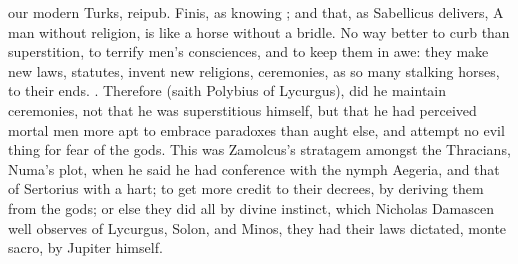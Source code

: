 {our modern Turks, reipub. Finis, as knowing ; and that, as Sabellicus delivers, A man without
religion, is like a horse without a bridle. No way better to curb than
superstition, to terrify men's consciences, and to keep them in awe:
they make new laws, statutes, invent new religions, ceremonies, as so
many stalking horses, to their ends. . Therefore (saith
Polybius of Lycurgus), did he maintain ceremonies, not that he
was superstitious himself, but that he had perceived mortal men more
apt to embrace paradoxes than aught else, and  attempt no evil
thing for fear of the gods. This was Zamolcus's stratagem amongst the
Thracians, Numa's plot, when he said he had conference with the nymph
Aegeria, and that of Sertorius with a hart; to get more credit to their
decrees, by deriving them from the gods; or else they did all by divine
instinct, which Nicholas Damascen well observes of Lycurgus, Solon, and
Minos, they had their laws dictated, monte sacro, by Jupiter himself.

}
